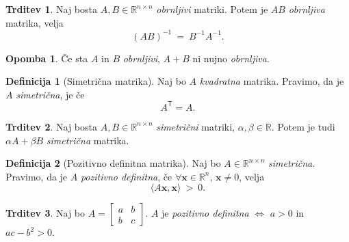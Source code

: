 \documentclass[11pt]{article}
\newcommand{\R}{\mathbb{R}}
\newcommand{\ls}{\langle}
\newcommand{\rs}{\rangle}
\newcommand{\x}{\mathbf{x}}
\newcommand{\0}{\mathbf{0}}
\newcommand{\T}{\mathsf{T}}
\theoremstyle{definition}
\newtheorem{definicija}{Definicija}[section]
\theoremstyle{definition}
\newtheorem{trditev}{Trditev}[section]
\theoremstyle{definition}
\theoremstyle{definition}
\newtheorem*{opomba}{Opomba}
\begin{document}
\begin{trditev}

Naj bosta $A,B \in \R^{n \times n}$ \textit{obrnljivi} matriki. Potem je $AB$ \textit{obrnljiva} matrika, velja
$$(AB)^{-1} ~=~ B^{-1}A^{-1}.$$

\end{trditev}
\vspace{0.5cm}

\begin{opomba}

Če sta $A$ in $B$ \textit{obrnljivi}, $A+B$ ni nujno \textit{obrnljiva}.

\end{opomba}
\vspace{0.5cm}

\begin{definicija}[Simetrična matrika]

Naj bo $A$ \textit{kvadratna} matrika. Pravimo, da je $A$ \textit{simetrična}, je če 
$$A^\T = A.$$

\end{definicija}
\vspace{0.5cm}

\begin{trditev}

Naj bosta $A,B \in \R^{n \times n}$ \textit{simetrični} matriki, $\alpha, \beta \in \R$. Potem je tudi $\alpha A + \beta B$ \textit{simetrična} matrika.

\end{trditev}
\vspace{0.5cm}

\begin{definicija}[Pozitivno definitna matrika]

Naj bo $A \in \R^{n \times n}$ \textit{simetrična}. Pravimo, da je $A$ \textit{pozitivno definitna}, če $\forall \x \in \R^n$, $\x \neq 0$, velja
$$\ls A\x, \x \rs ~>~ 0.$$ 

\end{definicija}
\vspace{0.5cm}

\begin{trditev}

Naj bo $A = \begin{bmatrix}
a & b \\
b & c
\end{bmatrix}$. $A$ je \textit{pozitivno definitna} $\iff$ $a>0$ in $ac - b^2 > 0$.

\end{trditev}
\vspace{0.5cm}
\end{document}
